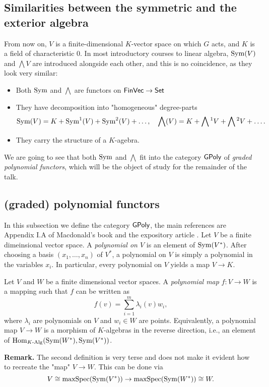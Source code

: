 \documentclass[../main.tex]{subfiles}
\begin{document}
\subsection{Similarities between the symmetric and the exterior algebra} %
\label{sub:Similarities between the symmetric and the exterior algebra}
From now on, $V$ is a finite-dimensional $K$-vector space on which 
$G$ acts, and $K$ is a field of characteristic $0$.
In most introductory courses to linear algebra, $\operatorname{Sym}(V)$ and $\bigwedge V$ are
introduced alongside each other, and this is no coincidence, as they look very
similar:
\begin{itemize}[wide,labelindent=0pt]
    \item Both $\operatorname{Sym}$ and $\bigwedge$ are functors on $\textnormal{$\textsf{FinVec}$} \to \textnormal{$\textsf{Set}$}$
    \item They have decomposition into "homogeneous" degree-parts 
        \begin{equation*}
            \operatorname{Sym}(V) = K + \operatorname{Sym}^1(V) + \operatorname{Sym}^2(V) + \dots, \quad \bigwedge(V) =
            K + \bigwedge{}^1V + \bigwedge{}^2V + \dots.
        \end{equation*}
    \item They carry the structure of a $K$-agebra.
\end{itemize}
We are going to see that both $\operatorname{Sym}$ and $\bigwedge$ fit into the category $\textnormal{$\textsf{GPoly}$}$ of 
\emph{graded polynomial functors}, which will be the object of study for the remainder
of the talk.

\subsection{(graded) polynomial functors}
In this subsection we define the category $\textnormal{$\textsf{GPoly}$}$, the main references are 
Appendix I.A of Macdonald's book \cite{macdonald1998symmetric} and the expository
article \cite{sam2012introduction}.
Let $V$ be a finite dimeinsional vector space. A \emph{polynomial on $V$}
is an element of $\operatorname{Sym}(V^*)$. After choosing a basis $(x_1, \dots, x_n)$ of 
$V^*$, a polynomial on $V$ is simply a polynomial in the variables $x_i$. In particular,
every polynomial on $V$ yields a map $V \to K$.

\begin{defi}
    Let $V$ and $W$ be a finite dimensional vector spaces. A \emph{polynomial map}
    $f: V \to W$ is a mapping such that $f$ can be written as 
    \begin{equation*}
        f(v) = \sum_{i=1}^m \lambda_i(v) w_i,
    \end{equation*}
    where $\lambda_i$ are polynomials on $V$ and $w_i \in W$ are points.
    Equivalently, a polynomial map $V \to W$ is a morphism of $K$-algebras in
    the reverse direction, i.e., an element of $\operatorname{Hom}_{K\text{-Alg}}(\operatorname{Sym}(W^*),
    \operatorname{Sym}(V^*))$.
\end{defi}
\textbf{Remark.} 
The second definition is very terse and does not make it evident how to
recreate the "map" $V \to W$. This can be done via
$$V \cong \operatorname{maxSpec}(\operatorname{Sym}(V^*)) \to \operatorname{maxSpec}(\operatorname{Sym}(W^*)) \cong W.$$
\end{document}
